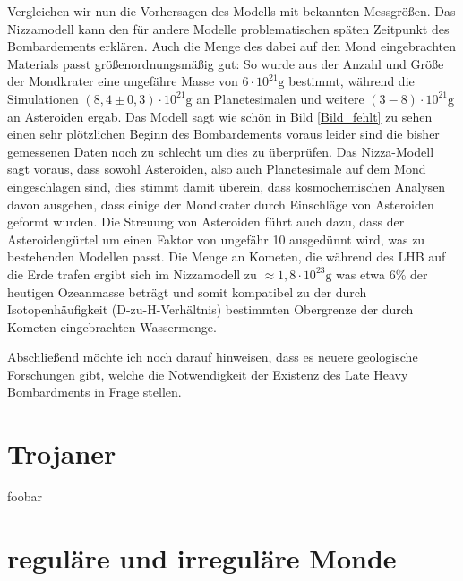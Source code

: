 \documentclass[10pt,a4paper,twoside]{article}
\begin{document}
Vergleichen wir nun die Vorhersagen des Modells mit bekannten Messgrößen. Das Nizzamodell kann den für andere Modelle problematischen späten Zeitpunkt des Bombardements erklären. Auch die Menge des dabei auf den Mond eingebrachten Materials passt größenordnungsmäßig gut: So wurde aus der Anzahl und Größe der Mondkrater eine ungefähre Masse von $6 \cdot 10^{21} \mathrm{g}$ bestimmt, während die Simulationen $\left(8,4 \pm 0,3\right) \cdot 10^{21} \mathrm{g}$ an Planetesimalen und weitere $\left( 3-8 \right) \cdot 10^{21} \mathrm{g}$ an Asteroiden ergab.%
Das Modell sagt wie schön in Bild \ref{Bild_fehlt} zu sehen einen sehr plötzlichen Beginn des Bombardements voraus leider sind die bisher gemessenen Daten noch zu schlecht um dies zu überprüfen.
Das Nizza-Modell sagt voraus, dass sowohl Asteroiden, also auch Planetesimale auf dem Mond eingeschlagen sind, dies stimmt damit überein, dass kosmochemischen Analysen davon ausgehen, dass einige der Mondkrater durch Einschläge von Asteroiden geformt wurden.
Die Streuung von Asteroiden führt auch dazu, dass der Asteroidengürtel um einen Faktor von ungefähr 10 ausgedünnt wird, was zu bestehenden Modellen passt.  %
Die Menge an Kometen, die während des LHB auf die Erde trafen ergibt sich im Nizzamodell zu $\approx 1,8 \cdot 10^{23} \mathrm{g}$ was etwa 6\% der heutigen Ozeanmasse beträgt und somit kompatibel zu der durch Isotopenhäufigkeit (D-zu-H-Verhältnis) bestimmten Obergrenze der durch Kometen eingebrachten Wassermenge\cite{Gomes2005}. %

Abschließend möchte ich noch darauf hinweisen, dass es neuere geologische Forschungen gibt, welche die Notwendigkeit der Existenz des Late Heavy Bombardments in Frage stellen\cite{Spudis2011}. %


\section{Trojaner}\label{Trojaner}
foobar

\section{reguläre und irreguläre Monde}\label{Monde}
\end{document}
